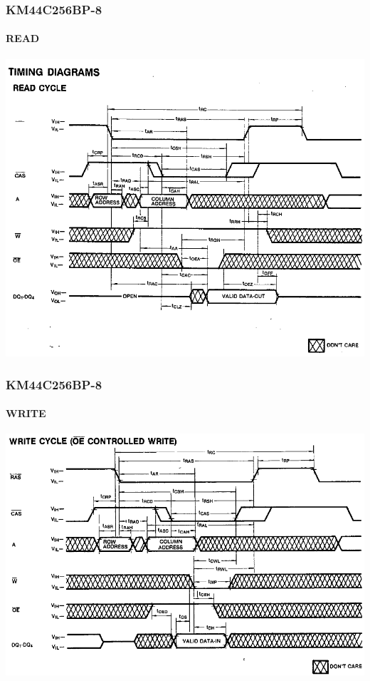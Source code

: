 \documentclass{beamer}
\begin{document}
\begin{frame}

	\frametitle{KM44C256BP-8}
	\framesubtitle{READ}
	\begin{center}
		\includegraphics[scale=0.35]{images/DRAM_Read_Cycle.png}
	\end{center}
	
\end{frame}

\begin{frame}

	\frametitle{KM44C256BP-8}
	\framesubtitle{WRITE}
	\begin{center}
		\includegraphics[scale=0.35]{images/DRAM_Write_Cycle.png}
	\end{center}
	
\end{frame}
\end{document}
